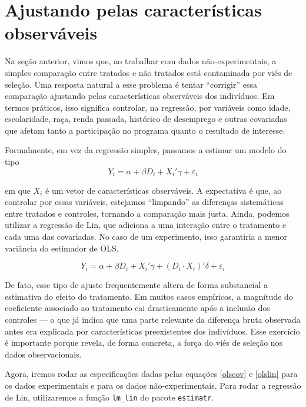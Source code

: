 \section{Ajustando pelas características observáveis}

Na seção anterior, vimos que, ao trabalhar com dados não-experimentais, a simples comparação entre tratados e não tratados está contaminada por viés de seleção. Uma resposta natural a esse problema é tentar ``corrigir'' essa comparação ajustando pelas características observáveis dos indivíduos. Em termos práticos, isso significa controlar, na regressão, por variáveis como idade, escolaridade, raça, renda passada, histórico de desemprego e outras covariadas que afetam tanto a participação no programa quanto o resultado de interesse.

Formalmente, em vez da regressão simples, passamos a estimar um modelo do tipo
\begin{equation}\label{olscov}
    Y_i = \alpha + \beta D_i + X_i'\gamma + \varepsilon_i
\end{equation}



em que $X_i$ é um vetor de características observáveis. A expectativa é que, ao controlar por essas variáveis, estejamos ``limpando'' as diferenças sistemáticas entre tratados e controles, tornando a comparação mais justa. Ainda, podemos utilizar a regressão de Lin, que adiciona a uma interação entre o tratamento e cada uma das covariadas. No caso de um experimento, isso garantiria a menor variância do estimador de OLS. 

\begin{equation}\label{olslin}
    Y_i = \alpha 
+ \beta D_i 
+ X_i' \gamma 
+ (D_i \cdot X_i)' \delta 
+ \varepsilon_i
\end{equation}


De fato, esse tipo de ajuste frequentemente altera de forma substancial a estimativa do efeito do tratamento. Em muitos casos empíricos, a magnitude do coeficiente associado ao tratamento cai drasticamente após a inclusão dos controles — o que já indica que uma parte relevante da diferença bruta observada antes era explicada por características preexistentes dos indivíduos. Esse exercício é importante porque revela, de forma concreta, a força do viés de seleção nos dados observacionais.

Agora, iremos rodar as especificações dadas pelas equações \eqref{olscov} e \eqref{olslin} para os dados experimentais e para os dados não-experimentais. Para rodar a regressão de Lin, utilizaremos a função \texttt{lm\_lin} do pacote \texttt{estimatr}.

